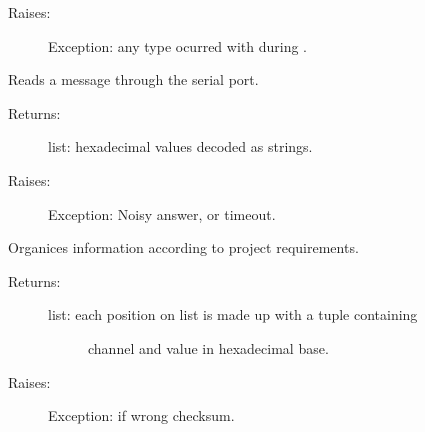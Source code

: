 \documentclass[letterpaper,10pt,english]{sphinxmanual}
\begin{document}
\begin{fulllineitems}
\begin{fulllineitems}
\begin{description}
\begin{description}
\end{description}

\item[{Raises:}] \leavevmode
Exception: any type ocurred with during .

\end{description}

\end{fulllineitems}


\begin{fulllineitems}
\label{\detokenize{code:reimaginedQuantum.CommunicationPort.read}}
Reads a message through the serial port.
\begin{description}
\item[{Returns:}] \leavevmode
list: hexadecimal values decoded as strings.

\item[{Raises:}] \leavevmode
Exception: Noisy answer, or timeout.

\end{description}

\end{fulllineitems}


\begin{fulllineitems}
\label{\detokenize{code:reimaginedQuantum.CommunicationPort.receive}}
Organices information according to project requirements.
\begin{description}
\item[{Returns:}] \leavevmode\begin{description}
\item[{list: each position on list is made up with a tuple containing}] \leavevmode
channel and value in hexadecimal base.

\end{description}

\item[{Raises:}] \leavevmode
Exception: if wrong checksum.

\end{description}

\end{fulllineitems}



\end{fulllineitems}
\end{document}
